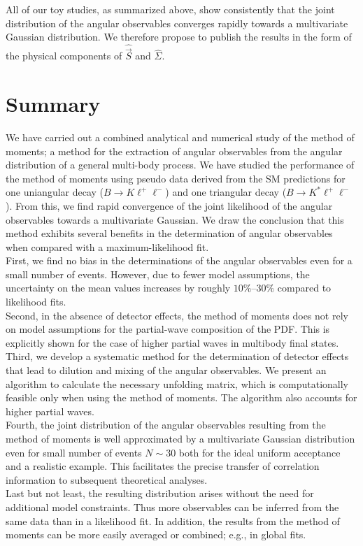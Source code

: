 \documentclass[aps,nofootinbib,preprintnumbers,prd,twocolumn]{revtex4-1}
\newcommand{\est}[1]{\widehat{#1}}
\newcommand{\vecest}[1]{\widehat{\vec{#1}}}
\begin{document}
All of our toy studies, as summarized above, show consistently that the
joint distribution of the angular observables converges rapidly towards a
multivariate Gaussian distribution. We therefore propose to publish the results
in the form of the physical components of $\vecest{S}$ and $\est{\Sigma}$.


\section{Summary}

We have carried out a combined analytical and numerical study of the method of
moments; a method for the extraction of angular observables from the angular
distribution of a general multi-body process.  We have studied the performance
of the method of moments using pseudo data derived from the SM predictions for
one uniangular decay ($B\to K\ell^+\ell^-$) and one triangular decay ($B\to
K^*\ell^+\ell^-$).  From this, we find rapid convergence of the joint
likelihood of the angular observables towards a multivariate Gaussian.  We draw
the conclusion that this method exhibits several benefits in the determination
of angular observables when compared with a maximum-likelihood fit.\\

First, we find no bias in the determinations of the angular
observables even for a small number of events.  However, due to fewer
model assumptions, the uncertainty on the mean values increases by
roughly $10\%$--$30\%$ compared
to likelihood fits.\\
Second, in the absence of detector effects, the method of moments does
not rely on model assumptions for the partial-wave composition of the
PDF. This is explicitly shown for the case of higher
partial waves in multibody final states.\\
Third, we develop a systematic method for the determination of
detector effects that lead to dilution and mixing of the angular
observables. We present an algorithm to calculate the necessary
unfolding matrix, which is computationally feasible only when using
the method
of moments. The algorithm also accounts for higher partial waves.\\
Fourth, the joint distribution of the angular observables resulting
from the method of moments is well approximated by a multivariate
Gaussian distribution even for small number of events $N \sim 30$ both
for the ideal uniform acceptance and a realistic example.  This
facilitates the precise transfer of correlation information
to subsequent theoretical analyses.\\
Last but not least, the resulting distribution arises without the need
for additional model constraints. Thus more observables can be
inferred from the same data than in a likelihood fit. In addition,
the results from the method of moments can be more easily averaged or combined; e.g., in global fits.\\
\end{document}

